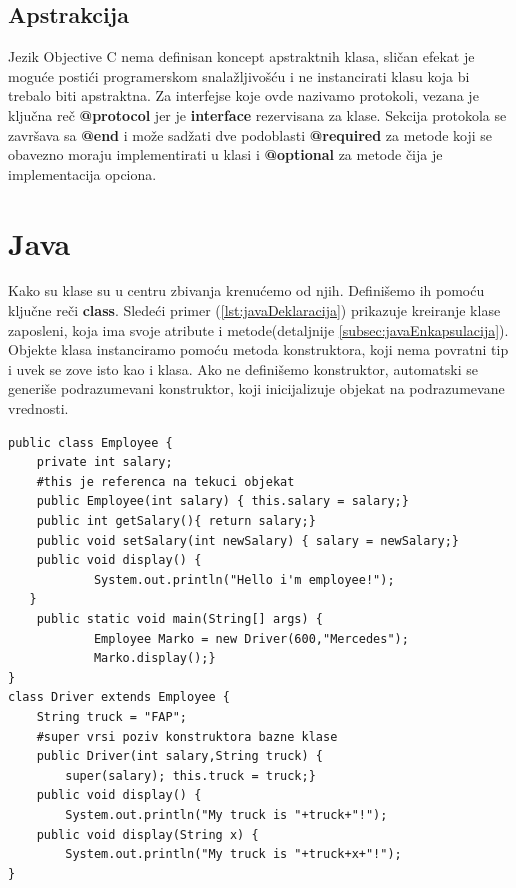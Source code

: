 \documentclass[a4paper]{article}
\begin{document}
{\subsection{Apstrakcija}
\label{subsec:ObjCApstrakcija}

Jezik Objective C nema definisan koncept apstraktnih klasa\cite{ObjectiveCbook}, sličan efekat je moguće postići programerskom snalažljivošću i ne instancirati klasu koja bi trebalo biti apstraktna. Za interfejse koje ovde nazivamo protokoli, vezana je ključna reč \textbf{@protocol} jer je \textbf{interface} rezervisana za klase. Sekcija protokola se završava sa \textbf{@end} i može sadžati dve podoblasti \textbf{@required} za metode koji se obavezno moraju implementirati u klasi i \textbf{@optional} za metode čija je implementacija opciona.

\section{Java}
\label{sec:java}

Kako su klase su u centru zbivanja krenućemo od njih. Definišemo ih pomoću ključne reči \textbf{class}. Sledeći primer (\ref{lst:javaDeklaracija}) prikazuje kreiranje klase zaposleni, koja ima svoje atribute i metode(detaljnije \ref{subsec:javaEnkapsulacija}). Objekte klasa instanciramo pomoću metoda konstruktora, koji nema povratni tip i uvek se zove isto kao i klasa. Ako ne definišemo konstruktor, automatski se generiše podrazumevani konstruktor\cite{horstmann2017core}, koji inicijalizuje objekat na podrazumevane vrednosti.

\begin{lstlisting}[caption={Primer deklarisanja klase sa enkapsulacijom i nasleđivanjem},frame=single, label=lst:javaDeklaracija]
public class Employee {
	private int salary;
	#this je referenca na tekuci objekat
	public Employee(int salary) { this.salary = salary;}
 	public int getSalary(){ return salary;}
	public void setSalary(int newSalary) { salary = newSalary;}
	public void display() {
     		System.out.println("Hello i'm employee!");
   }
	public static void main(String[] args) {
    		Employee Marko = new Driver(600,"Mercedes");
    		Marko.display();}    
}
class Driver extends Employee {
  	String truck = "FAP";
	#super vrsi poziv konstruktora bazne klase
   	public Driver(int salary,String truck) {
		super(salary); this.truck = truck;}
  	public void display() {
		System.out.println("My truck is "+truck+"!");
	public void display(String x) {
		System.out.println("My truck is "+truck+x+"!");
}
\end{lstlisting}
}
\end{document}
